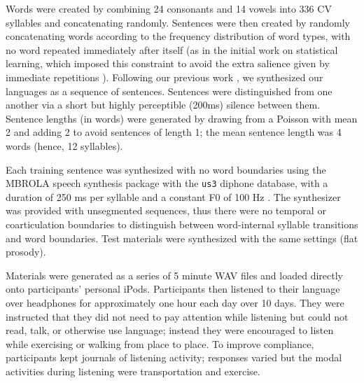 \documentclass[10pt]{article}
\begin{document}
Words were created by combining 24 consonants and 14 vowels into 336 CV syllables and concatenating randomly. Sentences were then created by randomly concatenating words according to the frequency distribution of word types, with no word repeated immediately after itself (as in the initial work on statistical learning, which imposed this constraint to avoid the extra salience given by immediate repetitions \cite{saffran1996a,saffran1996b}). Following our previous work \cite{frank2010,kurumada2011}, we synthesized our languages as a sequence of sentences. Sentences were distinguished from one another via a short but highly perceptible (200ms) silence between them. Sentence lengths (in words) were generated by drawing from a Poisson with mean 2 and adding 2 to avoid sentences of length 1; the mean sentence length was 4 words (hence, 12 syllables). 

Each training sentence was synthesized with no word boundaries using the MBROLA speech synthesis package with the \texttt{us3} diphone database, with a duration of 250 ms per syllable and a constant F0 of 100 Hz \cite{dutoit1996}. The synthesizer was provided with unsegmented sequences, thus there were no temporal or coarticulation boundaries to distinguish between word-internal syllable transitions and word boundaries. Test materials were synthesized with the same settings (flat prosody). 

Materials were generated as a series of 5 minute WAV files and loaded directly onto participants' personal iPods. Participants then listened to their language over headphones for approximately one hour each day over 10 days. They were instructed that they did not need to pay attention while listening but could not read, talk, or otherwise use language; instead they were encouraged to listen while exercising or walking from place to place. To improve compliance, participants kept journals of listening activity; responses varied but the modal activities during listening were transportation and exercise. 
\end{document}
